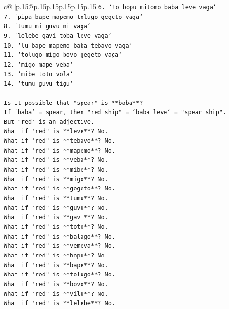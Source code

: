 \documentclass{article}
\begin{document}
{\begin{supertabular}{c@{$\;$}|p{.15\linewidth}@{}p{.15\linewidth}p{.15\linewidth}p{.15\linewidth}p{.15\linewidth}p{.15\linewidth}}
{{{\texttt{6. `to bopu mitomo baba leve vaga`} \\
\texttt{7. `pipa bape mapemo tolugo gegeto vaga`} \\
\texttt{8. `tumu mi guvu mi vaga`} \\
\texttt{9. `lelebe gavi toba leve vaga`} \\
\texttt{10. `lu bape mapemo baba tebavo vaga`} \\
\texttt{11. `tolugo migo bovo gegeto vaga`} \\
\texttt{12. `migo mape veba`} \\
\texttt{13. `mibe toto vola`} \\
\texttt{14. `tumu guvu tigu`} \\
\\ 
\texttt{Is it possible that "spear" is **baba**?} \\
\texttt{If `baba` = spear, then "red ship" = `baba leve` = "spear ship".} \\
\texttt{But "red" is an adjective.} \\
\texttt{What if "red" is **leve**? No.} \\
\texttt{What if "red" is **tebavo**? No.} \\
\texttt{What if "red" is **mapemo**? No.} \\
\texttt{What if "red" is **veba**? No.} \\
\texttt{What if "red" is **mibe**? No.} \\
\texttt{What if "red" is **migo**? No.} \\
\texttt{What if "red" is **gegeto**? No.} \\
\texttt{What if "red" is **tumu**? No.} \\
\texttt{What if "red" is **guvu**? No.} \\
\texttt{What if "red" is **gavi**? No.} \\
\texttt{What if "red" is **toto**? No.} \\
\texttt{What if "red" is **balago**? No.} \\
\texttt{What if "red" is **vemeva**? No.} \\
\texttt{What if "red" is **bopu**? No.} \\
\texttt{What if "red" is **bape**? No.} \\
\texttt{What if "red" is **tolugo**? No.} \\
\texttt{What if "red" is **bovo**? No.} \\
\texttt{What if "red" is **vilu**? No.} \\
\texttt{What if "red" is **lelebe**? No.} \\
}}}
\end{supertabular}}
\end{document}
